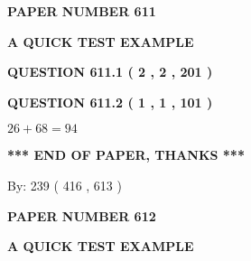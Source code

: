 \documentclass[12pt]{article}
\begin{document}
   
 {\textbf{ \Large{ PAPER NUMBER  611  }}}
   
   
\vspace{0.2in}
   
   
   
   
   
   
 \vspace{0.2in}
{\LARGE {\textbf{ A QUICK TEST EXAMPLE}}}
   
   
  
\vspace{0.2in}
  
{\textbf{\Large{QUESTION
611.1 
 ( 2 , 2 , 201 )
}}}
  
  
  
\vspace{0.2in}
  
{\textbf{\Large{QUESTION
611.2 
 ( 1 , 1 , 101 )
}}}
  
  
 
 

$ %
26 +  %
68=   %
94$
 
 
   
   
 \vspace{0.2in}
 
   
   
   
   
\vspace{1.0in} 
{\textbf{\large{ *** END OF PAPER, THANKS *** }}} 
   
   
\hspace{1.0in} By: 
 239 ( 416 ,  613 )
   
   
   
   
\newpage 
\setcounter{page}{ 
   612001 } 
   
   
   
   
 {\textbf{ \Large{ PAPER NUMBER  612  }}}
   
   
\vspace{0.2in}
   
   
   
   
   
   
 \vspace{0.2in}
{\LARGE {\textbf{ A QUICK TEST EXAMPLE}}}
   
   
  
\vspace{0.2in}
  
\end{document}
